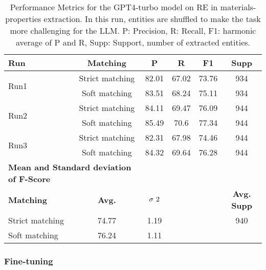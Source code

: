 \begin{table}[htbp]
    \small
    \centering
    \caption{Performance Metrics for the GPT4-turbo model on RE in materials-properties extraction. In this run, entities are shuffled to make the task more challenging for the LLM. P: Precision, R: Recall, F1: harmonic average of P and R, Supp: Support, number of extracted entities.}
    \begin{tabular}{lccccc}
        \toprule
        \textbf{Run} & \textbf{Matching} & \textbf{P} & \textbf{R} & \textbf{F1} & \textbf{Supp} \\
        \midrule
        \multirow{2}{*}{Run1} & Strict matching & 82.01 & 67.02 & 73.76 & 934 \\
        & Soft matching & 83.51 & 68.24 & 75.11 & 934 \\
        \midrule
        \multirow{2}{*}{Run2} & Strict matching & 84.11 & 69.47 & 76.09 & 944 \\
        & Soft matching & 85.49 & 70.6 & 77.34 & 944 \\
        \midrule
        \multirow{2}{*}{Run3} & Strict matching & 82.31 & 67.98 & 74.46 & 944 \\
        & Soft matching & 84.32 & 69.64 & 76.28 & 944 \\
        \midrule
        \multicolumn{2}{l}{\textbf{Mean and Standard deviation of F-Score}} & & & & \\
        \midrule
        \textbf{Matching} & \textbf{Avg.} & $\sigma\textsuperscript{2}$ & & & \textbf{Avg. Supp}\\
        Strict matching & 74.77 & 1.19 & & & 940 \\
        Soft matching & 76.24 & 1.11 & & \\
        \bottomrule
    \end{tabular}
\end{table}

\clearpage
\subsubsection{Fine-tuning}

